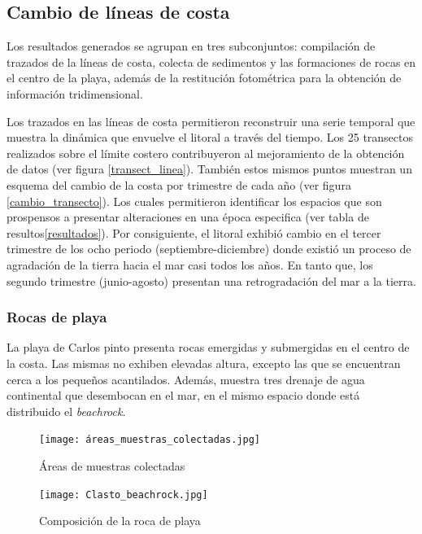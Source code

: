 \documentclass[11pt,]{article}
\begin{document}
\subsection{Cambio de líneas de
costa}\label{cambio-de-luxedneas-de-costa}

Los resultados generados se agrupan en tres subconjuntos: compilación de
trazados de la líneas de costa, colecta de sedimentos y las formaciones
de rocas en el centro de la playa, además de la restitución fotométrica
para la obtención de información tridimensional.

Los trazados en las líneas de costa permitieron reconstruir una serie
temporal que muestra la dinámica que envuelve el litoral a través del
tiempo. Los 25 transectos realizados sobre el límite costero
contribuyeron al mejoramiento de la obtención de datos (ver figura
\ref{transect_linea}). También estos mismos puntos muestran un esquema
del cambio de la costa por trimestre de cada año (ver figura
\ref{cambio_transecto}). Los cuales permitieron identificar los espacios
que son prospensos a presentar alteraciones en una época especifica (ver
tabla de resultos\ref{resultados}). Por consiguiente, el litoral exhibió
cambio en el tercer trimestre de los ocho periodo (septiembre-diciembre)
donde existió un proceso de agradación de la tierra hacia el mar casi
todos los años. En tanto que, los segundo trimestre (junio-agosto)
presentan una retrogradación del mar a la tierra.

\subsubsection{Rocas de playa}\label{rocas-de-playa}

La playa de Carlos pinto presenta rocas emergidas y submergidas en el
centro de la costa. Las mismas no exhiben elevadas altura, excepto las
que se encuentran cerca a los pequeños acantilados. Además, muestra tres
drenaje de agua continental que desembocan en el mar, en el mismo
espacio donde está distribuido el \emph{beachrock}.

\begin{figure}
\centering
\texttt{[image: áreas\_muestras\_colectadas.jpg]}
\caption{Áreas de muestras colectadas\label{muestras}}
\end{figure}

\begin{figure}
\centering
\texttt{[image: Clasto\_beachrock.jpg]}
\caption{Composición de la roca de playa\label{clasto}}
\end{figure}
\end{document}
